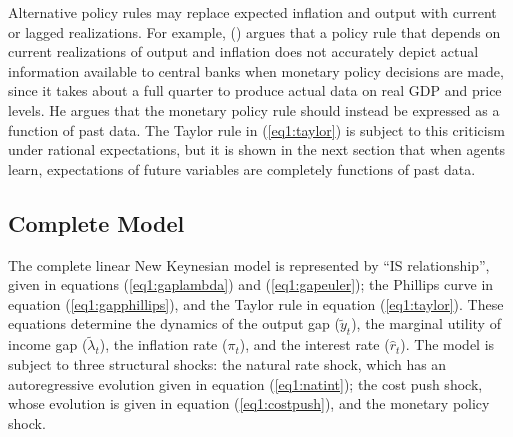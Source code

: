\documentclass[11pt]{article}
\newcommand{\citee}[1]{\citeauthor*{#1} (\citeyear{#1})}
\newcommand{\h}[1]{\hat{#1}}
\begin{document}
Alternative policy rules may replace expected inflation and output with current or lagged realizations.  For example, \citee{mccallum1997} argues that a policy rule that depends on current realizations of output and inflation does not accurately depict actual information available to central banks when monetary policy decisions are made, since it takes about a full quarter to produce actual data on real GDP and price levels.  He argues that the monetary policy rule should instead be expressed as a function of past data.  The Taylor rule in (\ref{eq1:taylor}) is subject to this criticism under rational expectations, but it is shown in the next section that when agents learn, expectations of future variables are completely functions of past data.

\subsection{Complete Model}
The complete linear New Keynesian model is represented by ``IS relationship'', given in equations (\ref{eq1:gaplambda}) and (\ref{eq1:gapeuler}); the Phillips curve in equation (\ref{eq1:gapphillips}), and the Taylor rule in equation (\ref{eq1:taylor}).  These equations determine the dynamics of the output gap ($\tilde{y}_t$), the marginal utility of income gap ($\tilde{\lambda}_t$), the inflation rate ($\pi_t$), and the interest rate ($\h{r}_t$).  The model is subject to three structural shocks: the natural rate shock, which has an autoregressive evolution given in equation (\ref{eq1:natint}); the cost push shock, whose evolution is given in equation (\ref{eq1:costpush}), and the monetary policy shock.
\end{document}
